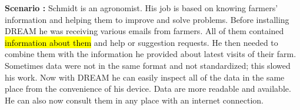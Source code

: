 \begin{flushleft}
\textbf{Scenario :} 
Schmidt is an agronomist. His job is based on knowing farmers' information and helping them to improve and solve problems. Before installing DREAM he was receiving various emails from farmers. All of them contained \hl{information about them} and help or suggestion requests. He then needed to combine them with the information he provided about latest visits of their farm. Sometimes data were not in the same format and not standardized; this slowed his work. Now with DREAM he can easily inspect all of the data in the same place from the convenience of his device. Data are more readable and available. He can also now consult them in any place with an internet connection.
\end{flushleft}
